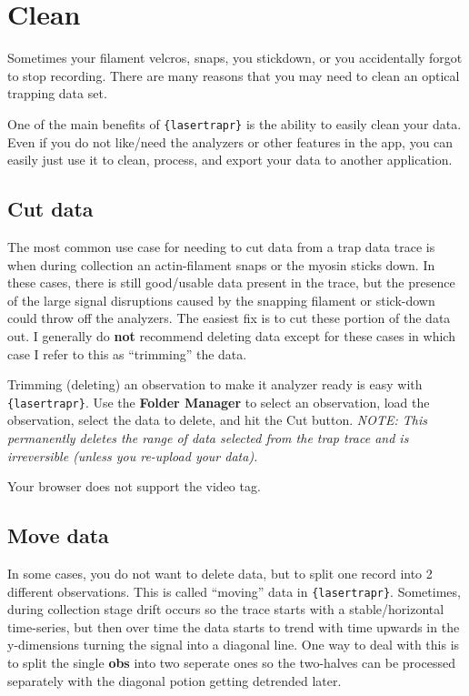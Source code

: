 \documentclass[
]{book}
\begin{document}
\section{Clean}\label{clean}

Sometimes your filament velcros, snaps, you stickdown, or you accidentally forgot to stop recording. There are many reasons that you may need to clean an optical trapping data set.

One of the main benefits of \texttt{\{lasertrapr\}} is the ability to easily clean your data. Even if you do not like/need the analyzers or other features in the app, you can easily just use it to clean, process, and export your data to another application.

\subsection{Cut data}\label{cut-data}

The most common use case for needing to cut data from a trap data trace is when during collection an actin-filament snaps or the myosin sticks down. In these cases, there is still good/usable data present in the trace, but the presence of the large signal disruptions caused by the snapping filament or stick-down could throw off the analyzers. The easiest fix is to cut these portion of the data out. I generally do \textbf{not} recommend deleting data except for these cases in which case I refer to this as ``trimming'' the data.

Trimming (deleting) an observation to make it analyzer ready is easy with \texttt{\{lasertrapr\}}. Use the \textbf{Folder Manager} to select an observation, load the observation, select the data to delete, and hit the Cut button. \emph{NOTE: This permanently deletes the range of data selected from the trap trace and is irreversible (unless you re-upload your data).}

Your browser does not support the video tag.

\subsection{Move data}\label{move-data}

In some cases, you do not want to delete data, but to split one record into 2 different observations. This is called ``moving'' data in \texttt{\{lasertrapr\}}. Sometimes, during collection stage drift occurs so the trace starts with a stable/horizontal time-series, but then over time the data starts to trend with time upwards in the y-dimensions turning the signal into a diagonal line. One way to deal with this is to split the single \textbf{obs} into two seperate ones so the two-halves can be processed separately with the diagonal potion getting detrended later.
\end{document}
